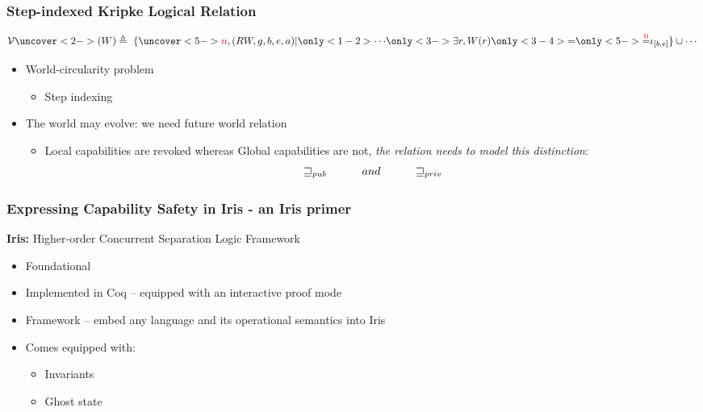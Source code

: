 \documentclass{beamer}
\newcommand\myeq[1]{\stackrel{\mathclap{\normalfont\mbox{#1}}}{=}}
\begin{document}
\begin{frame}
\frametitle{Step-indexed Kripke Logical Relation}
 
$$ \mathcal{V}\uncover<2->{(W)}\triangleq~\{\uncover<5->{{\color{red}n}}, (RW, g, b, e, a) | \only<1-2>{\cdots} \only<3->{\exists r, W(r) \only<3-4>{=} \only<5->{\myeq{\small {\color{red} n}}} \iota_{[b,e]}} \} \cup \cdots $$
 
 \begin{itemize}
 	\item<4-> World-circularity problem
 		\begin{itemize}
 			\item<5-> {\color{red} Step indexing}
 		\end{itemize}
 	\item<6-> The world may evolve: we need future world relation
 		\begin{itemize}
 			\item<7-> Local capabilities are revoked whereas Global capabilities are not, \textit{the relation needs to model this distinction}:
 			$$ \sqsupseteq_{pub} \hspace{1 cm} and \hspace{1 cm} \sqsupseteq_{priv} $$
 		\end{itemize}
 \end{itemize}

\end{frame}

\begin{frame}
\frametitle{Expressing Capability Safety in Iris - an Iris primer}

\textbf{Iris:} Higher-order Concurrent Separation Logic Framework
\begin{itemize}
	\item<2-> Foundational
	\item<3-> Implemented in Coq -- equipped with an interactive proof mode
	\item<4-> Framework -- embed any language and its operational semantics into Iris
	\item<5-> Comes equipped with: 
		\begin{itemize}
			\item<5-> Invariants
			\item<6-> Ghost state
		\end{itemize}
\end{itemize}


\end{frame}
\end{document}
